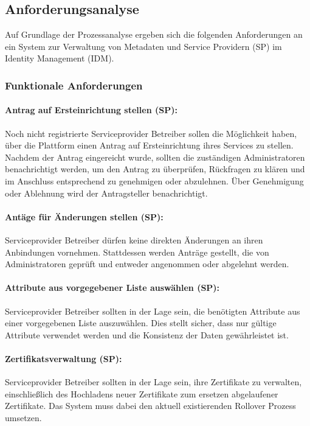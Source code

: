 \documentclass[a4paper, fontsize=11pt]{scrartcl}
\begin{document}
\subsection{Anforderungsanalyse}\label{subsec:anforderungsanalyse-results}
Auf Grundlage der Prozessanalyse ergeben sich die folgenden Anforderungen an ein System zur Verwaltung von Metadaten und Service Providern (SP) im Identity Management (IDM).

\subsubsection{Funktionale Anforderungen}\label{subsubsec:functional-requirements}
\paragraph{Antrag auf Ersteinrichtung stellen (SP):}
Noch nicht registrierte Serviceprovider Betreiber sollen die Möglichkeit haben, über die Plattform einen Antrag auf Ersteinrichtung ihres Services zu stellen.
Nachdem der Antrag eingereicht wurde, sollten die zuständigen Administratoren benachrichtigt werden, um den Antrag zu überprüfen, Rückfragen zu klären und im Anschluss entsprechend zu genehmigen oder abzulehnen. 
Über Genehmigung oder Ablehnung wird der Antragsteller benachrichtigt.

\paragraph{Antäge für Änderungen stellen (SP):}
Serviceprovider Betreiber dürfen keine direkten Änderungen an ihren Anbindungen vornehmen.
Stattdessen werden Anträge gestellt, die von Administratoren geprüft und entweder angenommen oder abgelehnt werden.

\paragraph{Attribute aus vorgegebener Liste auswählen (SP):}
Serviceprovider Betreiber sollten in der Lage sein, die benötigten Attribute aus einer vorgegebenen Liste auszuwählen.
Dies stellt sicher, dass nur gültige Attribute verwendet werden und die Konsistenz der Daten gewährleistet ist.

\paragraph{Zertifikatsverwaltung (SP):}
Serviceprovider Betreiber sollten in der Lage sein, ihre Zertifikate zu verwalten, einschließlich des Hochladens neuer Zertifikate zum ersetzen abgelaufener Zertifikate.
Das System muss dabei den aktuell existierenden Rollover Prozess umsetzen.
\end{document}
